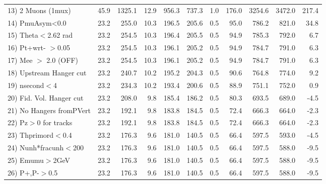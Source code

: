 \begin{table}[h!]
{{\begin{tabular}{||l||r|r|r|r|r|r|r||r||r||r||}
 13) 2 Muons (1mux)       &      45.9 &    1325.1 &      12.9 &     956.3 &     737.3 &       1.0 &     176.0 &    3254.6 &    3472.0 &     217.4 \\
 14) PmuAsym<0.0          &      23.2 &     255.0 &      10.3 &     196.5 &     205.6 &       0.5 &      95.0 &     786.2 &     821.0 &      34.8 \\
 15) Theta$<$2.62 rad     &      23.2 &     254.5 &      10.3 &     196.4 &     205.5 &       0.5 &      94.9 &     785.3 &     792.0 &       6.7 \\
 16) Pt+wrt- $>$0.05      &      23.2 &     254.5 &      10.3 &     196.1 &     205.2 &       0.5 &      94.9 &     784.7 &     791.0 &       6.3 \\
 17) Mee $>$ 2.0  (OFF)   &      23.2 &     254.5 &      10.3 &     196.1 &     205.2 &       0.5 &      94.9 &     784.7 &     791.0 &       6.3 \\
 18) Upstream Hanger cut  &      23.2 &     240.7 &      10.2 &     195.2 &     204.3 &       0.5 &      90.6 &     764.8 &     774.0 &       9.2 \\
 19) nsecond$<$4          &      23.2 &     234.3 &      10.2 &     193.4 &     200.6 &       0.5 &      88.9 &     751.1 &     752.0 &       0.9 \\
 20) Fid. Vol. Hanger cut &      23.2 &     208.0 &       9.8 &     185.4 &     186.2 &       0.5 &      80.3 &     693.5 &     689.0 &      -4.5 \\
 21) No Hangers fromPVert &      23.2 &     192.1 &       9.8 &     183.8 &     184.5 &       0.5 &      72.4 &     666.3 &     664.0 &      -2.3 \\
 22) Pz$>$0 for tracks    &      23.2 &     192.1 &       9.8 &     183.8 &     184.5 &       0.5 &      72.4 &     666.3 &     664.0 &      -2.3 \\
 23) Thprimord$<$0.4      &      23.2 &     176.3 &       9.6 &     181.0 &     140.5 &       0.5 &      66.4 &     597.5 &     593.0 &      -4.5 \\
 24) Nunh*fracunh$<$200   &      23.2 &     176.3 &       9.6 &     181.0 &     140.5 &       0.5 &      66.4 &     597.5 &     588.0 &      -9.5 \\
 25) Emumu$>$2GeV         &      23.2 &     176.3 &       9.6 &     181.0 &     140.5 &       0.5 &      66.4 &     597.5 &     588.0 &      -9.5 \\
 26) P+,P-$>$0.5          &      23.2 &     176.3 &       9.6 &     181.0 &     140.5 &       0.5 &      66.4 &     597.5 &     588.0 &      -9.5 \\

\end{tabular}}}
\end{table}
